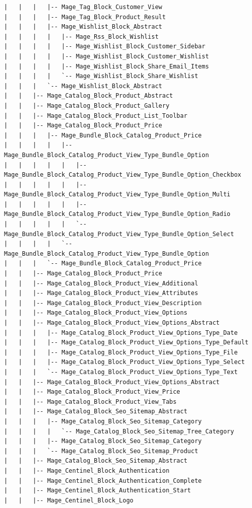 \documentclass[oneside]{book}
\begin{document}
\begin{lstlisting}
|   |   |   |-- Mage_Tag_Block_Customer_View
|   |   |   |-- Mage_Tag_Block_Product_Result
|   |   |   |-- Mage_Wishlist_Block_Abstract
|   |   |   |   |-- Mage_Rss_Block_Wishlist
|   |   |   |   |-- Mage_Wishlist_Block_Customer_Sidebar
|   |   |   |   |-- Mage_Wishlist_Block_Customer_Wishlist
|   |   |   |   |-- Mage_Wishlist_Block_Share_Email_Items
|   |   |   |   `-- Mage_Wishlist_Block_Share_Wishlist
|   |   |   `-- Mage_Wishlist_Block_Abstract
|   |   |-- Mage_Catalog_Block_Product_Abstract
|   |   |-- Mage_Catalog_Block_Product_Gallery
|   |   |-- Mage_Catalog_Block_Product_List_Toolbar
|   |   |-- Mage_Catalog_Block_Product_Price
|   |   |   |-- Mage_Bundle_Block_Catalog_Product_Price
|   |   |   |   |-- Mage_Bundle_Block_Catalog_Product_View_Type_Bundle_Option
|   |   |   |   |   |-- Mage_Bundle_Block_Catalog_Product_View_Type_Bundle_Option_Checkbox
|   |   |   |   |   |-- Mage_Bundle_Block_Catalog_Product_View_Type_Bundle_Option_Multi
|   |   |   |   |   |-- Mage_Bundle_Block_Catalog_Product_View_Type_Bundle_Option_Radio
|   |   |   |   |   `-- Mage_Bundle_Block_Catalog_Product_View_Type_Bundle_Option_Select
|   |   |   |   `-- Mage_Bundle_Block_Catalog_Product_View_Type_Bundle_Option
|   |   |   `-- Mage_Bundle_Block_Catalog_Product_Price
|   |   |-- Mage_Catalog_Block_Product_Price
|   |   |-- Mage_Catalog_Block_Product_View_Additional
|   |   |-- Mage_Catalog_Block_Product_View_Attributes
|   |   |-- Mage_Catalog_Block_Product_View_Description
|   |   |-- Mage_Catalog_Block_Product_View_Options
|   |   |-- Mage_Catalog_Block_Product_View_Options_Abstract
|   |   |   |-- Mage_Catalog_Block_Product_View_Options_Type_Date
|   |   |   |-- Mage_Catalog_Block_Product_View_Options_Type_Default
|   |   |   |-- Mage_Catalog_Block_Product_View_Options_Type_File
|   |   |   |-- Mage_Catalog_Block_Product_View_Options_Type_Select
|   |   |   `-- Mage_Catalog_Block_Product_View_Options_Type_Text
|   |   |-- Mage_Catalog_Block_Product_View_Options_Abstract
|   |   |-- Mage_Catalog_Block_Product_View_Price
|   |   |-- Mage_Catalog_Block_Product_View_Tabs
|   |   |-- Mage_Catalog_Block_Seo_Sitemap_Abstract
|   |   |   |-- Mage_Catalog_Block_Seo_Sitemap_Category
|   |   |   |   `-- Mage_Catalog_Block_Seo_Sitemap_Tree_Category
|   |   |   |-- Mage_Catalog_Block_Seo_Sitemap_Category
|   |   |   `-- Mage_Catalog_Block_Seo_Sitemap_Product
|   |   |-- Mage_Catalog_Block_Seo_Sitemap_Abstract
|   |   |-- Mage_Centinel_Block_Authentication
|   |   |-- Mage_Centinel_Block_Authentication_Complete
|   |   |-- Mage_Centinel_Block_Authentication_Start
|   |   |-- Mage_Centinel_Block_Logo

\end{lstlisting}
\end{document}
